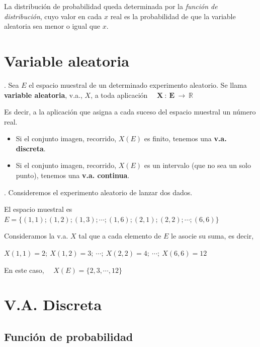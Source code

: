 La distribución de probabilidad queda determinada por la \emph{función de distribución}, cuyo valor en cada $x$ real es la probabilidad de que la variable aleatoria sea menor o igual que $x$.

\section{Variable aleatoria}

\begin{definition}
.	Sea $E$ el espacio muestral de un determinado experimento aleatorio. Se llama \textbf{variable aleatoria}, v.a., $X$, a toda aplicación
$\quad \boldsymbol{ X\ : \ E \ \to  \ \mathbb R }$

\vspace{2mm} Es decir, a la aplicación que asigna a cada suceso del espacio muestral un número real.

\begin{itemize}
\item Si el conjunto imagen, recorrido, $X(E)$ es finito, tenemos una \textbf{v.a. discreta}.	
\item Si el conjunto imagen, recorrido, $X(E)$ es un intervalo \textcolor{gris}{(que no sea un solo punto)}, tenemos una \textbf{v.a. continua}.
\end{itemize}
\end{definition}

\begin{example}
.	Consideremos el experimento aleatorio de lanzar dos dados.

\vspace{2mm} El espacio muestral es 	$E=\{(1,1); (1,2); (1,3) ; \cdots ; (1,6); (2,1); (2,2); \cdots ; (6,6) \}$

\vspace{2mm} Consideramos la v.a. $X$ tal que a cada elemento de $E$ le asocie su suma, es decir,

\vspace{2mm} $X(1,1)=2;\  X(1,2)=3; \  \cdots  ;\  X(2,2)=4;\  \cdots; \  X(6,6)=12$

\vspace{2mm} En este caso, $\quad X(E)=\{2,3,\cdots, 12\}$
\end{example}

\section{V.A. Discreta}

\subsection{Función de probabilidad}

